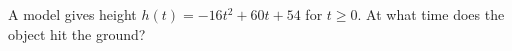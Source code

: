 A model gives height $h(t)=-16t^2+60t+54$ for $t\ge0$. At what time does the object hit the ground?
